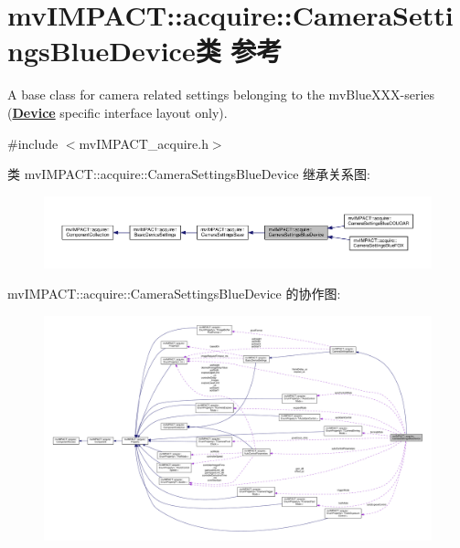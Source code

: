 \hypertarget{classmv_i_m_p_a_c_t_1_1acquire_1_1_camera_settings_blue_device}{\section{mv\+I\+M\+P\+A\+C\+T\+:\+:acquire\+:\+:Camera\+Settings\+Blue\+Device类 参考}
\label{classmv_i_m_p_a_c_t_1_1acquire_1_1_camera_settings_blue_device}
}


A base class for camera related settings belonging to the mv\+Blue\+X\+X\+X-\/series ({\bfseries \hyperlink{classmv_i_m_p_a_c_t_1_1acquire_1_1_device}{Device}} specific interface layout only).  




{\ttfamily \#include $<$mv\+I\+M\+P\+A\+C\+T\+\_\+acquire.\+h$>$}



类 mv\+I\+M\+P\+A\+C\+T\+:\+:acquire\+:\+:Camera\+Settings\+Blue\+Device 继承关系图\+:
\nopagebreak
\begin{figure}[H]
\begin{center}
\leavevmode
\includegraphics[width=350pt]{classmv_i_m_p_a_c_t_1_1acquire_1_1_camera_settings_blue_device__inherit__graph}
\end{center}
\end{figure}


mv\+I\+M\+P\+A\+C\+T\+:\+:acquire\+:\+:Camera\+Settings\+Blue\+Device 的协作图\+:
\nopagebreak
\begin{figure}[H]
\begin{center}
\leavevmode
\includegraphics[width=350pt]{classmv_i_m_p_a_c_t_1_1acquire_1_1_camera_settings_blue_device__coll__graph}
\end{center}
\end{figure}
